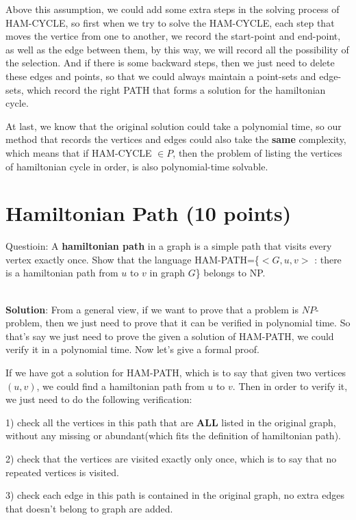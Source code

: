 \documentclass{article}
\begin{document}
Above this assumption, we could add some extra steps in the solving process of HAM-CYCLE, so first when we try to solve the HAM-CYCLE, each step that moves the vertice from one to another, we record the start-point and end-point, as well as the edge between them, by this way, we will record all the possibility of the selection. And if there is some backward steps, then we just need to delete these edges and points, so that we could always maintain a point-sets and edge-sets, which record the right PATH that forms a solution for the hamiltonian cycle.

At last, we know that the original solution could take a polynomial time, so our method that records the vertices and edges could also take the \textbf{same} complexity, which means that if HAM-CYCLE $\in{P}$, then the problem of listing the vertices of hamiltonian cycle in order, is also polynomial-time solvable.


\section{Hamiltonian Path (10 points)}
Questioin: A \textbf{hamiltonian path} in a graph is a simple path that visits every vertex exactly once. Show that the language HAM-PATH=\{$<G,u,v>$ : there is a hamiltonian path from $u$ to $v$ in graph $G$\} belongs to NP.

~\\
\textbf{Solution}:\newline
From a general view, if we want to prove that a problem is $NP$-problem, then we just need to prove that it can be verified in polynomial time. So that's say we just need to prove the given a solution of HAM-PATH, we could verify it in a polynomial time. Now let's give a formal proof.

If we have got a solution for HAM-PATH, which is to say that given two vertices $(u, v)$, we could find a hamiltonian path from $u$ to $v$. Then in order to verify it, we just need to do the following verification:

1) check all the vertices in this path that are \textbf{ALL} listed in the original graph, without any missing or abundant(which fits the definition of hamiltonian path).

2) check that the vertices are visited exactly only once, which is to say that no repeated vertices is visited.

3) check each edge in this path is contained in the original graph, no extra edges that doesn't belong to graph are added. 
\end{document}
